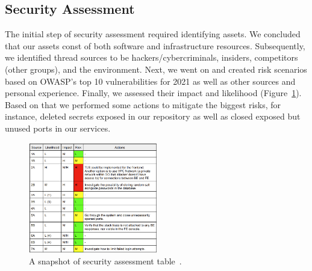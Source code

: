 \subsection{Security Assessment}

The initial step of security assessment required identifying assets. We concluded that our assets const of both software and infrastructure resources. Subsequently, we identified thread sources to be hackers/cybercriminals, insiders, competitors (other groups), and the environment. Next, we went on and created risk scenarios based on OWASP's top 10 vulnerabilities for 2021 as well as other sources and personal experience. Finally, we assessed their impact and likelihood (Figure~\ref{fig:securityAssessment}). Based on that we performed some actions to mitigate the biggest risks, for instance, deleted secrets exposed in our repository as well as closed exposed but unused ports in our services.

\begin{figure}[h]
\centering
\includegraphics[width=0.5\textwidth]{images/SecurityAssessmentSnapshot.png}
\caption{A snapshot of security assessment table~\cite{securityAssessment}.}
\label{fig:securityAssessment}
\end{figure}